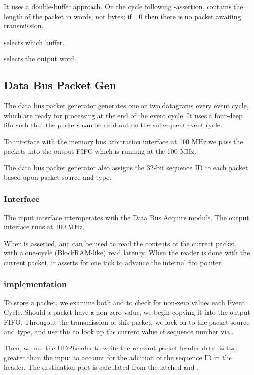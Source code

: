 It uses a double-buffer approach. On the cycle following
-assertion,  contains the length of
the packet in words, not bytes; if  =0 then there is
no packet awaiting transmission.

 selects which buffer. 

 selects the output word. 

\subsection{Data Bus Packet Gen}
The data bus packet generator generates one or two datagrams every
event cycle, which are ready for processing at the end of the event
cycle. It uses a four-deep fifo such that the packets can be read out
on the subsequent event cycle.

To interface with the memory bus arbitration interface at 100 MHz we
pass the packets into the output FIFO which is running at the 100 MHz.

The data bus packet generator also assigns the 32-bit sequence ID to
each packet based upon packet source and type.

\subsubsection{Interface}
The input interface interoperates with the Data Bus Acquire module.
The output interface runs at 100 MHz. 

When  is asserted,  and
 can be used to read the contents of the current
packet, with a one-cycle (BlockRAM-like) read latency. When the reader
is done with the current packet, it asserts  for one
tick to advance the internal fifo pointer.


\subsubsection{implementation}
To store a packet, we examine both  and
 to check for non-zero values each Event Cycle.
Should a packet have a non-zero value, we begin copying it into the
output FIFO. Througout the transmission of this packet, we lock on to
the packet source and type, and use this to look up the current value
of sequence number via  .

Then, we use the UDPheader to write the relevant packet header data.
 is two greater than the input  to
account for the addition of the sequence ID in the header. The
destination port is calculated from the latched  and
.

